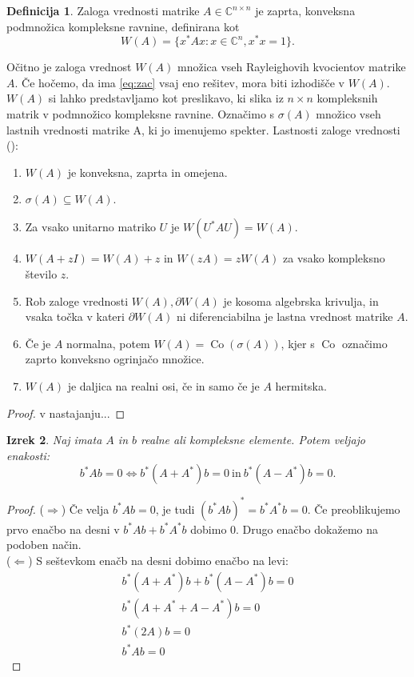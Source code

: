 \documentclass[12pt,a4paper]{amsart}
\theoremstyle{definition}
\newtheorem{definicija}{Definicija}[section]
\theoremstyle{plain}
\newtheorem{izrek}[definicija]{Izrek}
\newcommand{\Co}{\operatorname{Co}} %
\newcommand{\C}{\mathbb C}
\begin{document}
\begin{definicija}
Zaloga vrednosti matrike $A \in \C^{n\times n}$ je zaprta, konveksna podmnožica kompleksne ravnine, definirana kot
$$W(A)=\{x^\ast Ax: x \in \C^n, x^\ast x=1\}.$$
\end{definicija}
Očitno je zaloga vrednost $W(A)$ množica vseh Rayleighovih kvocientov matrike $A$. Če hočemo, da ima \eqref{eq:zac} vsaj eno rešitev, mora biti izhodišče v $W(A)$. $W(A)$ si lahko predstavljamo kot preslikavo, ki slika iz $n\times n$ kompleksnih matrik v podmnožico kompleksne ravnine. Označimo s $\sigma(A)$ množico vseh lastnih vrednosti matrike A, ki jo imenujemo spekter. Lastnosti zaloge vrednosti (\cite{num}):
\begin{enumerate}
\item $W(A)$ je konveksna, zaprta in omejena.
\item $\sigma(A)\subseteq W(A).$
\item Za vsako unitarno matriko $U$ je $W(U^\ast AU)=W(A).$
\item $W(A+zI)=W(A)+z$ in $W(zA)=zW(A)$ za vsako kompleksno število $z$.
\item Rob zaloge vrednosti $W(A), \partial W(A)$ je kosoma algebrska krivulja, in vsaka točka v kateri $\partial W(A)$ ni diferenciabilna je lastna vrednost matrike $A$.
\item Če je $A$ normalna, potem $W(A)=\Co(\sigma(A))$, kjer s $\Co$ označimo zaprto konveksno ogrinjačo množice.
\item $W(A)$ je daljica na realni osi, če in samo če je $A$ hermitska.
\end{enumerate}
\begin{proof}
v nastajanju...
\end{proof}
\begin{izrek}
Naj imata $A$ in $b$ realne ali kompleksne elemente. Potem veljajo enakosti:
$$b^\ast Ab=0\Leftrightarrow b^\ast (A+A^\ast)b=0 \ \textrm{in}\  b^\ast(A-A^\ast)b=0.$$
\end{izrek}
\begin{proof}
($\Rightarrow$) Če velja $b^\ast Ab=0$, je tudi $(b^\ast Ab)^\ast=b^\ast A^\ast b=0$. Če preoblikujemo prvo enačbo na desni v $b^\ast Ab +b^\ast A^\ast b$ dobimo 0. Drugo enačbo dokažemo na podoben način.\\
($\Leftarrow$) S seštevkom enačb na desni dobimo enačbo na levi:
\begin{align*}
 b^\ast (A+A^\ast)b+b^\ast(A-A^\ast)b=0\\
b^\ast (A+A^\ast+A-A^\ast)b=0\\
b^\ast (2A)b=0\\
b^\ast Ab=0
\end{align*}
\end{proof}
\end{document}
